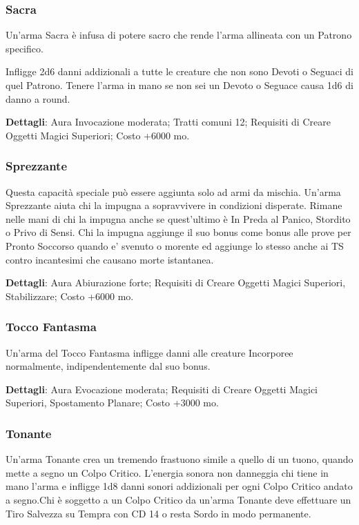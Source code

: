 \begin{multicols}{2}
\subsubsection{Sacra}

Un'arma Sacra è infusa di potere sacro che rende l'arma allineata con un Patrono specifico. 

Infligge 2d6 danni addizionali a tutte le creature che non sono Devoti o Seguaci di quel Patrono. Tenere l'arma in mano se non sei un Devoto o Seguace causa 1d6 di danno a round.

\textbf{Dettagli}: Aura Invocazione moderata; Tratti comuni 12; Requisiti di Creare Oggetti Magici Superiori; Costo +6000 mo.


\subsubsection{Sprezzante}

Questa capacità speciale può essere aggiunta solo ad armi da mischia. Un'arma Sprezzante aiuta chi la impugna a sopravvivere in condizioni disperate. Rimane nelle mani di chi la impugna anche se quest'ultimo è In Preda al Panico, Stordito o Privo di Sensi. Chi la impugna aggiunge il suo bonus come bonus alle prove per Pronto Soccorso quando e' svenuto  o morente ed aggiunge lo stesso anche ai TS contro incantesimi che causano morte istantanea.

\textbf{Dettagli}: Aura Abiurazione forte; Requisiti di Creare Oggetti Magici Superiori, Stabilizzare; Costo +6000 mo.

\subsubsection{Tocco Fantasma}

Un'arma del Tocco Fantasma infligge danni alle creature Incorporee normalmente, indipendentemente dal suo bonus. 

\textbf{Dettagli}: Aura Evocazione moderata; Requisiti di Creare Oggetti Magici Superiori, Spostamento Planare; Costo +3000 mo.

\subsubsection{Tonante}

Un'arma Tonante crea un tremendo frastuono simile a quello di un tuono, quando mette a segno un Colpo Critico. L'energia sonora non danneggia chi tiene in mano l'arma e infligge 1d8 danni sonori addizionali per ogni Colpo Critico andato a segno.Chi è soggetto a un Colpo Critico da un'arma Tonante deve effettuare un Tiro Salvezza su Tempra con CD 14 o resta Sordo in modo permanente.


\end{multicols}
